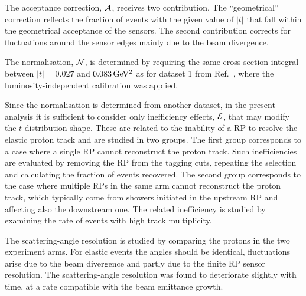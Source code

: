 \documentclass[doublecol]{epl/epl2}
\def\un#1{\,{\rm #1}}
\begin{document}
The acceptance correction, ${\cal A}$, receives two contribution. The ``geometrical'' correction reflects the fraction of events with the given value of $|t|$ that fall within the geometrical acceptance of the sensors. The second contribution corrects for fluctuations around the sensor edges mainly due to the beam divergence.

The normalisation, ${\cal N}$, is determined by requiring the same cross-section integral between $|t| = 0.027$ and $0.083\un{GeV^2}$ as for dataset 1 from Ref.~\cite{totem-8tev-tot1}, where the luminosity-independent calibration was applied.

Since the normalisation is determined from another dataset, in the present analysis it is sufficient to consider only inefficiency effects, ${\cal E}$, that may modify the $t$-distribution shape. These are related to the inability of a RP to resolve the elastic proton track and are studied in two groups. The first group corresponds to a case where a single RP cannot reconstruct the proton track. Such inefficiencies are evaluated by removing the RP from the tagging cuts, repeating the selection and calculating the fraction of events recovered. The second group corresponds to the case where multiple RPs in the same arm cannot reconstruct the proton track, which typically come from showers initiated in the upstream RP and affecting also the downstream one. The related inefficiency is studied by examining the rate of events with high track multiplicity.

The scattering-angle resolution is studied by comparing the protons in the two experiment arms. For elastic events the angles should be identical, fluctuations arise due to the beam divergence and partly due to the finite RP sensor resolution. The scattering-angle resolution was found to deteriorate slightly with time, at a rate compatible with the beam emittance growth.
\end{document}
